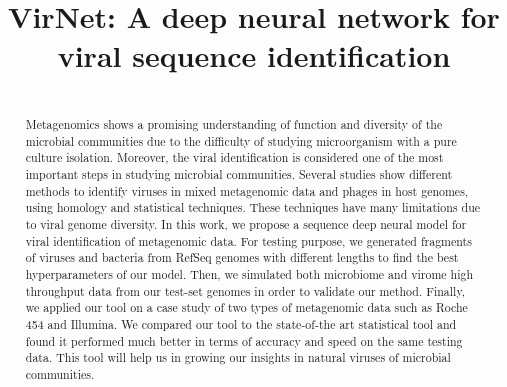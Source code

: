\documentclass[conference]{IEEEtran}
\begin{document}
\title{VirNet: A deep neural network for viral sequence identification}


\author{
\and
{}
\and
{}
\and
{}
\and
{}
}

\maketitle

\begin{abstract}\\Metagenomics shows a promising understanding of function and diversity of the microbial communities due to the difficulty of studying microorganism with a pure culture isolation. Moreover, the viral identification is considered one of the most important steps in studying microbial communities. Several studies show different methods to identify viruses in mixed metagenomic data and phages in host genomes, using homology and statistical techniques. These techniques have many limitations due to viral genome diversity. In this work, we propose a sequence deep neural model for viral identification of metagenomic data. For testing purpose, we generated fragments of viruses and bacteria from RefSeq genomes with different lengths to find the best hyperparameters of our model. Then, we simulated both microbiome and virome high throughput data from our test-set genomes in order to validate our method. Finally, we applied our tool on a case study of two types of metagenomic data such as Roche 454 and Illumina. We compared our tool to the state-of-the art statistical tool and found it performed much better in terms of accuracy and speed on the same testing data. This tool will help us in growing our insights in natural viruses of microbial communities.
\end{abstract}
\end{document}
